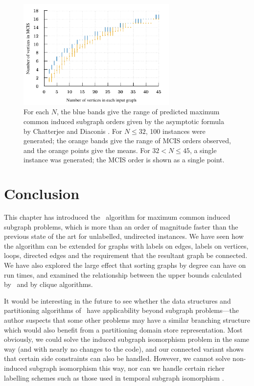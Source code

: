 \begin{figure}[htb]
    \centering
    \includegraphics*[width=0.7\textwidth]{14-mcsplit-i-undirected/data-for-diaconis-and-chatterjee/plot}
    \caption{For each $N$, the blue bands give the range of predicted maximum
    common induced subgraph orders given by the asymptotic formula by
    Chatterjee and Diaconis \cite{chatterjee2021isomorphisms}.  For $N \leq 32$,
    100 instances were generated; the orange bands give the range of MCIS orders
    observed, and the orange points give the means.  For $32 < N \leq 45$,
    a single instance was generated; the MCIS order is shown as a single point.}
    \label{figure:mcis-order-bands}
\end{figure}

\section{Conclusion}
\label{sec:mcsplit-conclusion}

This chapter has introduced the \McSplit\ algorithm for maximum common induced subgraph
problems, which is more than an order of magnitude faster than the
previous state of the art for unlabelled, undirected instances. We have
seen how the algorithm can be extended for graphs with labels on edges, labels
on vertices, loops, directed edges and the requirement that the resultant graph
be connected.  We have also explored the large effect that sorting graphs
by degree can have on run times, and examined the relationship between the upper bounds
calculated by \McSplit\ and by clique algorithms.

It would be interesting in the future to see whether the data structures and
partitioning algorithms of \McSplit\ have applicability beyond subgraph
problems---the author suspects that some other problems may have a similar
branching structure which would also benefit from a partitioning domain store
representation. Most obviously, we could solve the induced subgraph isomorphism
problem in the same way (and with nearly no changes to the code), and our
connected variant shows that certain side constraints can also be handled.
However, we cannot solve non-induced subgraph isomorphism this way, nor can we
handle certain richer labelling schemes such as those used in temporal subgraph
isomorphism \citep{DBLP:conf/asunam/RedmondC13}.

